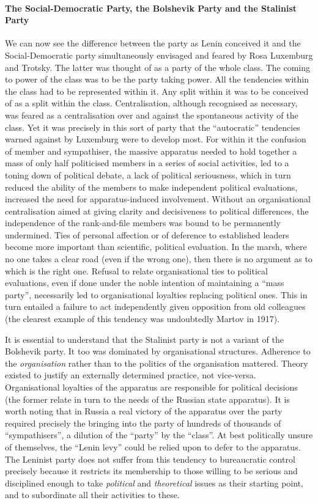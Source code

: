 \paragraph{The Social-Democratic Party, the Bolshevik Party and the Stalinist Party}

We can now see the difference between the party as Lenin conceived it and the Social-Democratic party simultaneously envisaged and feared by Rosa Luxemburg and Trotsky. The latter was thought of as a party of the whole class. The coming to power of the class was to be the party taking power. All the tendencies within the class had to be represented within it. Any split within it was to be conceived of as a split within the class. Centralisation, although recognised as necessary, was feared as a centralisation over and against the spontaneous activity of the class. Yet it was precisely in this sort of party that the ``autocratic'' tendencies warned against by Luxemburg were to develop most. For within it the confusion of member and sympathiser, the massive apparatus needed to hold together a mass of only half politicised members in a series of social activities, led to a toning down of political debate, a lack of political seriousness, which in turn reduced the ability of the members to make independent political evaluations, increased the need for apparatus-induced involvement. Without an organisational centralisation aimed at giving clarity and decisiveness to political differences, the independence of the rank-and-file members was bound to be permanently undermined. Ties of personal affection or of deference to established leaders become more important than scientific, political evaluation. In the marsh, where no one takes a clear road (even if the wrong one), then there is no argument as to which is the right one. Refusal to relate organisational ties to political evaluations, even if done under the noble intention of maintaining a ``mass party'', necessarily led to organisational loyalties replacing political ones. This in turn entailed a failure to act independently given opposition from old colleagues (the clearest example of this tendency was undoubtedly Martov in 1917).

It is essential to understand that the Stalinist party is not a variant of the Bolshevik party. It too was dominated by organisational structures. Adherence to the \emph{organisation} rather than to the politics of the organisation mattered. Theory existed to justify an externally determined practice, not vice-versa. Organisational loyalties of the apparatus are responsible for political decisions (the former relate in turn to the needs of the Russian state apparatus). It is worth noting that in Russia a real victory of the apparatus over the party required precisely the bringing into the party of hundreds of thousands of ``sympathisers'', a dilution of the ``party'' by the ``class''. At best politically unsure of themselves, the ``Lenin levy'' could be relied upon to defer to the apparatus. The Leninist party does not suffer from this tendency to bureaucratic control precisely because it restricts its membership to those willing to be serious and disciplined enough to take \emph{political} and \emph{theoretical} issues as their starting point, and to subordinate all their activities to these.

